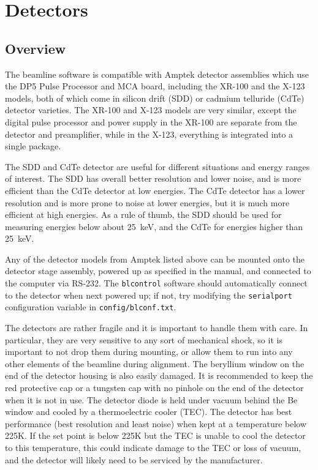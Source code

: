 \chapter{Detectors\label{chap:det}}

\section{Overview}

The beamline software is compatible with Amptek detector assemblies which use
the DP5 Pulse Processor and MCA board\cite{dp5_user_man}, including the
XR-100\cite{xr-100-sdd-manual} and the
X-123\cite{x-123-sdd-manual,x-123-cdte-manual} models, both of which come in
silicon drift (SDD) or cadmium telluride (CdTe) detector varieties. The XR-100
and X-123 models are very similar, except the digital pulse processor and power
supply in the XR-100 are separate from the detector and preamplifier, while in
the X-123, everything is integrated into a single package.

The SDD and CdTe detector are useful for different situations and energy ranges
of interest. The SDD has overall better resolution and lower noise, and is more
efficient than the CdTe detector at low energies. The CdTe detector has a lower
resolution and is more prone to noise at lower energies, but it is much more
efficient at high energies. As a rule of thumb, the SDD should be used for
measuring energies below about 25~keV, and the CdTe for energies higher than
25~keV.

Any of the detector models from Amptek listed above can be mounted onto the
detector stage assembly, powered up as specified in the manual, and connected to
the computer via RS-232. The \texttt{blcontrol} software should automatically
connect to the detector when next powered up; if not, try modifying the
\texttt{serialport} configuration variable in \texttt{config/blconf.txt}.

The detectors are rather fragile and it is important to handle them with
care. In particular, they are very sensitive to any sort of mechanical shock, so
it is important to not drop them during mounting, or allow them to run into any
other elements of the beamline during alignment. The beryllium window on the end
of the detector housing is also easily damaged. It is recommended to keep the
red protective cap or a tungsten cap with no pinhole on the end of the detector
when it is not in use. The detector diode is held under vacuum behind the Be
window and cooled by a thermoelectric cooler (TEC). The detector has best performance
(best resolution and least noise) when kept at a temperature below 225K. If the
set point is below 225K but the TEC is unable to cool the detector to this
temperature, this could indicate damage to the TEC or loss of vacuum, and the
detector will likely need to be serviced by the manufacturer.

